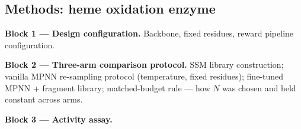 \subsection{Methods: heme oxidation enzyme}
\label{sec:met:heme}


\begin{planlist}
  \item \textbf{Block 1 --- Design configuration.} Backbone, fixed residues,
        reward pipeline configuration.
  \item \textbf{Block 2 --- Three-arm comparison protocol.} SSM library
        construction; vanilla MPNN re-sampling protocol (temperature, fixed
        residues); fine-tuned MPNN + fragment library; matched-budget rule ---
        how $N$ was chosen and held constant across arms.
  \item \textbf{Block 3 --- Activity assay.}
\end{planlist}
